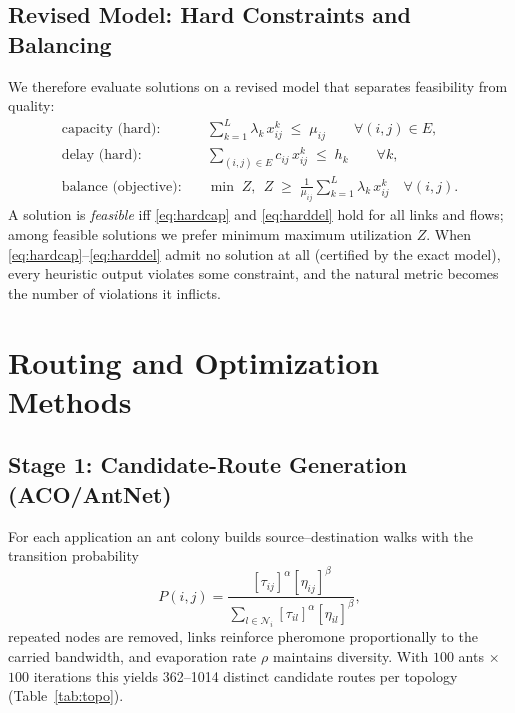 \documentclass[journal]{IEEEtran}
\begin{document}
\subsection{Revised Model: Hard Constraints and Balancing}
\label{sec:revfo}
We therefore evaluate solutions on a revised model that separates
feasibility from quality:
\begin{align}
\text{capacity (hard):}\quad
&\sum_{k=1}^{L}\lambda_k\,x_{ij}^{k} \;\le\; \mu_{ij}
\qquad \forall (i,j)\in E, \label{eq:hardcap}\\
\text{delay (hard):}\quad
&\sum_{(i,j)\in E} c_{ij}\,x_{ij}^{k} \;\le\; h_k
\qquad \forall k, \label{eq:harddel}\\
\text{balance (objective):}\quad
&\min\; Z,\ \ Z \;\ge\;
\frac{1}{\mu_{ij}}\sum_{k=1}^{L}\lambda_k\,x_{ij}^{k}
\quad \forall (i,j). \label{eq:minmax}
\end{align}
A solution is \emph{feasible} iff \eqref{eq:hardcap} and \eqref{eq:harddel}
hold for all links and flows; among feasible solutions we prefer minimum
maximum utilization $Z$. When \eqref{eq:hardcap}--\eqref{eq:harddel} admit no
solution at all (certified by the exact model), every heuristic output
violates some constraint, and the natural metric becomes the number of
violations it inflicts.

\section{Routing and Optimization Methods}
\label{sec:method}

\subsection{Stage 1: Candidate-Route Generation (ACO/AntNet)}
For each application an ant colony builds source--destination walks with the
transition probability
\begin{equation}
P(i,j)=\frac{[\tau_{ij}]^{\alpha}[\eta_{ij}]^{\beta}}
{\sum_{l\in\mathcal{N}_i}[\tau_{il}]^{\alpha}[\eta_{il}]^{\beta}},
\label{eq:aco}
\end{equation}
repeated nodes are removed, links reinforce pheromone proportionally to the
carried bandwidth, and evaporation rate $\rho$ maintains diversity. With
$100$ ants $\times$ $100$ iterations this yields 362--1014 distinct candidate
routes per topology (Table~\ref{tab:topo}).
\end{document}
